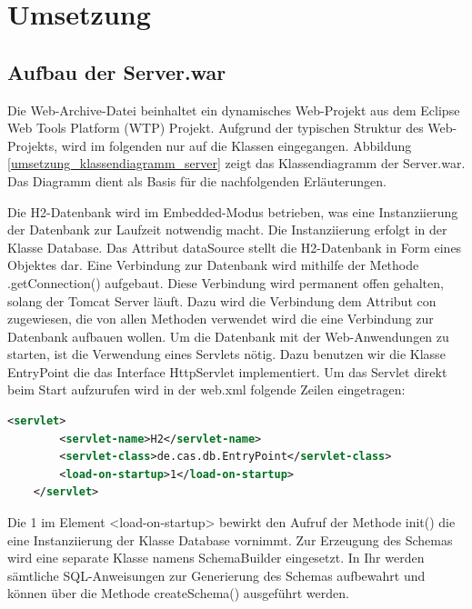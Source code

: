 

\chapter{Umsetzung}
\label{ch:umsetzung}


\section{Aufbau der Server.war}

Die Web-Archive-Datei beinhaltet ein dynamisches Web-Projekt aus dem Eclipse Web Tools Platform (WTP) Projekt. Aufgrund der typischen Struktur des Web-Projekts, wird im folgenden nur auf die Klassen eingegangen. Abbildung \ref{umsetzung_klassendiagramm_server} zeigt das Klassendiagramm der Server.war. Das Diagramm dient als Basis für die nachfolgenden Erläuterungen. 

Die H2-Datenbank wird im Embedded-Modus betrieben, was eine Instanziierung der Datenbank zur Laufzeit notwendig macht. Die Instanziierung erfolgt in der Klasse Database. Das Attribut dataSource stellt die H2-Datenbank in Form eines Objektes dar. Eine Verbindung zur Datenbank wird mithilfe der Methode .getConnection() aufgebaut. Diese Verbindung wird permanent offen gehalten, solang der Tomcat Server läuft. Dazu wird die Verbindung dem Attribut con zugewiesen, die von allen Methoden verwendet wird die eine Verbindung zur Datenbank aufbauen wollen. Um die Datenbank mit der Web-Anwendungen zu starten, ist die Verwendung eines Servlets nötig. Dazu benutzen wir die Klasse EntryPoint die das Interface HttpServlet implementiert. Um das Servlet direkt beim Start aufzurufen wird in der web.xml folgende Zeilen eingetragen: 

\begin{lstlisting}[language=XML]
	<servlet>
		<servlet-name>H2</servlet-name>
		<servlet-class>de.cas.db.EntryPoint</servlet-class>
		<load-on-startup>1</load-on-startup>
	</servlet>
\end{lstlisting}

Die 1 im Element <load-on-startup> bewirkt den Aufruf der Methode init() die eine Instanziierung der Klasse Database vornimmt. Zur Erzeugung des Schemas wird eine separate Klasse namens SchemaBuilder eingesetzt. In Ihr werden sämtliche SQL-Anweisungen zur Generierung des Schemas aufbewahrt und können über die Methode createSchema() ausgeführt werden.


